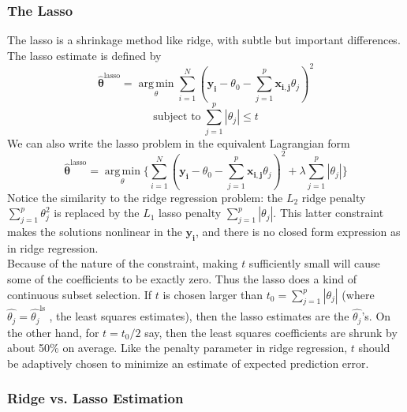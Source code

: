 \documentclass[twoside]{article}
\DeclareMathOperator*{\argmin}{arg\,min}
\begin{document}
\subsubsection{The Lasso}
The lasso is a shrinkage method like ridge, with subtle but important differences. The lasso estimate is defined by
\begin{equation*}
    \hat{\boldsymbol{\theta}}^\text{lasso} = \argmin\limits_\theta \sum\limits_{i = 1}^{N}(\boldsymbol{y_i} - \theta_0 - \sum\limits_{j = 1}^{p}\boldsymbol{x_{i, j}}\theta_j)^2
\end{equation*}
\begin{equation*}
    \text{subject to} \hspace{3pt} \sum\limits_{j = 1}^{p}|\theta_j| \leq t
\end{equation*}
We can also write the lasso problem in the equivalent Lagrangian form
\begin{equation*}
    \hat{\boldsymbol{\theta}}^\text{lasso} = \argmin\limits_\theta\{\sum\limits_{i = 1}^{N}(\boldsymbol{y_i} - \theta_0 - \sum\limits_{j = 1}^{p}\boldsymbol{x_{i, j}}\theta_j)^2 + \lambda\sum\limits_{j = 1}^{p}|\theta_j|\}
\end{equation*}
Notice the similarity to the ridge regression problem: the $L_2$ ridge penalty $\sum\limits_{j = 1}^{p}\theta_j^2$ is replaced by the $L_1$ lasso penalty $\sum\limits_{j = 1}^{p}|\theta_j|$. This latter constraint makes the solutions nonlinear in the $\boldsymbol{y_i}$, and there is no closed form expression as in ridge regression.\\
Because of the nature of the constraint, making $t$ sufficiently small will cause some of the coefficients to be exactly zero. Thus the lasso does a kind of continuous subset selection. If $t$ is chosen larger than $t_0 = \sum\limits_{j = 1}^{p}|\theta_j|$ (where $\hat{\theta_j} = \hat{\theta_j}^{\text{ls}} $ , the least squares estimates), then the lasso estimates are the $\hat{\theta_j}$’s. On the other hand, for $t = t_0 / 2$ say, then the least squares coefficients are shrunk by about 50\% on average. Like the penalty parameter in ridge regression, $t$ should be adaptively chosen to minimize an estimate of expected prediction error.

\subsubsection{Ridge vs. Lasso Estimation}
\end{document}

